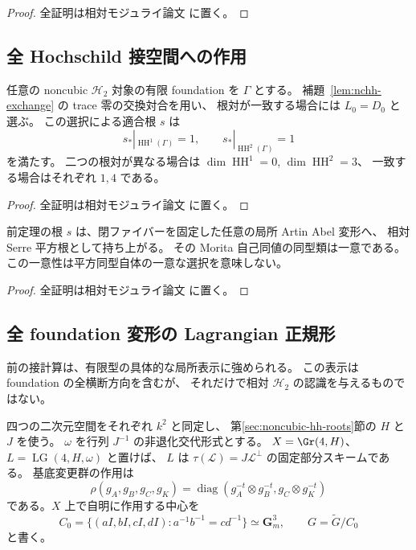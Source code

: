 \begin{proof}
全証明は相対モジュライ論文 \cite[\texttt{noncubic_hh_roots}]{QuadricModuli2026} に置く。
\end{proof}

\subsection{全 Hochschild 接空間への作用}

\begin{theorem}\label{thm:noncubic-hh-trivial-root}
任意の noncubic $\mathcal H_2$ 対象の有限 foundation を $\Gamma$ とする。
補題~\ref{lem:nchh-exchange} の trace 零の交換対合を用い、
根対が一致する場合には $L_0=D_0$ と選ぶ。
この選択による適合根 $s$ は
\[
s_*|_{\operatorname{HH}^1(\Gamma)}=1,\qquad s_*|_{\operatorname{HH}^2(\Gamma)}=1
\]
を満たす。
二つの根対が異なる場合は $\dim\operatorname{HH}^1=0$, $\dim\operatorname{HH}^2=3$、
一致する場合はそれぞれ $1,4$ である。
\end{theorem}

\begin{proof}
全証明は相対モジュライ論文 \cite[\texttt{noncubic_hh_roots}]{QuadricModuli2026} に置く。
\end{proof}

\begin{corollary}\label{cor:noncubic-root-all-artin}
前定理の根 $s$ は、閉ファイバーを固定した任意の局所 Artin Abel 変形へ、
相対 Serre 平方根として持ち上がる。
その Morita 自己同値の同型類は一意である。
この一意性は平方同型自体の一意な選択を意味しない。
\end{corollary}
\begin{proof}
全証明は相対モジュライ論文 \cite[\texttt{noncubic_hh_roots}]{QuadricModuli2026} に置く。
\end{proof}

\subsection{全 foundation 変形の Lagrangian 正規形}
\label{subsec:noncubic-lagrangian-slice}

前の接計算は、有限型の具体的な局所表示に強められる。
この表示は foundation の全横断方向を含むが、
それだけで相対 $\mathcal H_2$ の認識を与えるものではない。

四つの二次元空間をそれぞれ $k^2$ と同定し、
第\ref{sec:noncubic-hh-roots}節の $H$ と $J$ を使う。
$\omega$ を行列 $J^{-1}$ の非退化交代形式とする。
$X=\Gr(4,H)$、$L=\operatorname{LG}(4,H,\omega)$ と置けば、
$L$ は $\tau(\mathscr L)=J\mathscr L^\perp$ の固定部分スキームである。
基底変更群の作用は
\[
 \rho(g_A,g_B,g_C,g_K)
 =\operatorname{diag}(g_A^{-t}\otimes g_B^{-t},
                      g_C\otimes g_K^{-t})
\]
である。$X$ 上で自明に作用する中心を
\[
 C_0=\{(aI,bI,cI,dI):a^{-1}b^{-1}=cd^{-1}\}
       \simeq\mathbf G_m^3,
 \qquad G=\widetilde G/C_0
\]
と書く。

